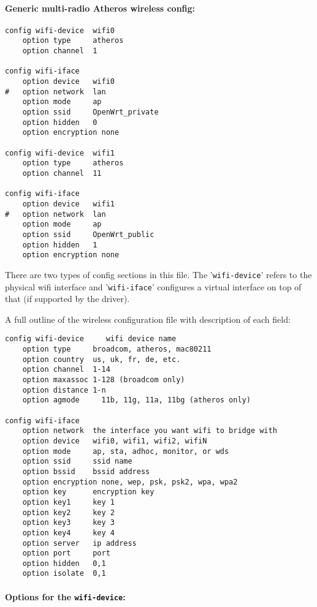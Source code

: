 \paragraph{Generic multi-radio Atheros wireless config:}

\begin{Verbatim}
config wifi-device  wifi0
    option type     atheros
    option channel  1

config wifi-iface
    option device   wifi0
#   option network  lan
    option mode     ap
    option ssid     OpenWrt_private
    option hidden   0
    option encryption none

config wifi-device  wifi1
    option type     atheros
    option channel  11

config wifi-iface
    option device   wifi1
#   option network  lan
    option mode     ap
    option ssid     OpenWrt_public
    option hidden   1
    option encryption none
\end{Verbatim}

There are two types of config sections in this file. The '\texttt{wifi-device}' refers to
the physical wifi interface and '\texttt{wifi-iface}' configures a virtual interface on top
of that (if supported by the driver).

A full outline of the wireless configuration file with description of each field:

\begin{Verbatim}
config wifi-device     wifi device name
    option type     broadcom, atheros, mac80211
    option country  us, uk, fr, de, etc.
    option channel  1-14
    option maxassoc 1-128 (broadcom only)
    option distance 1-n
    option agmode     11b, 11g, 11a, 11bg (atheros only)

config wifi-iface
    option network  the interface you want wifi to bridge with 
    option device   wifi0, wifi1, wifi2, wifiN
    option mode     ap, sta, adhoc, monitor, or wds
    option ssid     ssid name
    option bssid    bssid address
    option encryption none, wep, psk, psk2, wpa, wpa2 
    option key      encryption key
    option key1     key 1
    option key2     key 2
    option key3     key 3
    option key4     key 4
    option server   ip address
    option port     port
    option hidden   0,1
    option isolate  0,1
\end{Verbatim}

\paragraph{Options for the \texttt{wifi-device}:}

